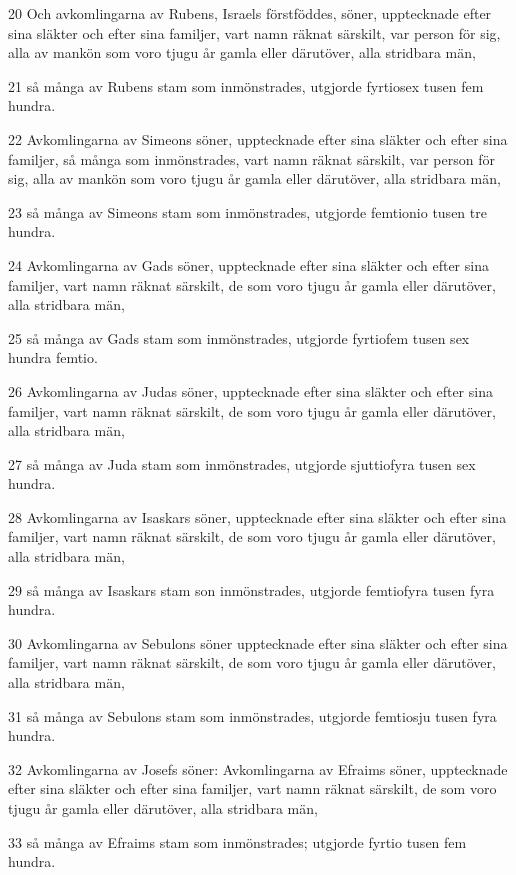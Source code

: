 \par 20 Och avkomlingarna av Rubens, Israels förstföddes, söner, upptecknade efter sina släkter och efter sina familjer, vart namn räknat särskilt, var person för sig, alla av mankön som voro tjugu år gamla eller därutöver, alla stridbara män,
\par 21 så många av Rubens stam som inmönstrades, utgjorde fyrtiosex tusen fem hundra.
\par 22 Avkomlingarna av Simeons söner, upptecknade efter sina släkter och efter sina familjer, så många som inmönstrades, vart namn räknat särskilt, var person för sig, alla av mankön som voro tjugu år gamla eller därutöver, alla stridbara män,
\par 23 så många av Simeons stam som inmönstrades, utgjorde femtionio tusen tre hundra.
\par 24 Avkomlingarna av Gads söner, upptecknade efter sina släkter och efter sina familjer, vart namn räknat särskilt, de som voro tjugu år gamla eller därutöver, alla stridbara män,
\par 25 så många av Gads stam som inmönstrades, utgjorde fyrtiofem tusen sex hundra femtio.
\par 26 Avkomlingarna av Judas söner, upptecknade efter sina släkter och efter sina familjer, vart namn räknat särskilt, de som voro tjugu år gamla eller därutöver, alla stridbara män,
\par 27 så många av Juda stam som inmönstrades, utgjorde sjuttiofyra tusen sex hundra.
\par 28 Avkomlingarna av Isaskars söner, upptecknade efter sina släkter och efter sina familjer, vart namn räknat särskilt, de som voro tjugu år gamla eller därutöver, alla stridbara män,
\par 29 så många av Isaskars stam son inmönstrades, utgjorde femtiofyra tusen fyra hundra.
\par 30 Avkomlingarna av Sebulons söner upptecknade efter sina släkter och efter sina familjer, vart namn räknat särskilt, de som voro tjugu år gamla eller därutöver, alla stridbara män,
\par 31 så många av Sebulons stam som inmönstrades, utgjorde femtiosju tusen fyra hundra.
\par 32 Avkomlingarna av Josefs söner: Avkomlingarna av Efraims söner, upptecknade efter sina släkter och efter sina familjer, vart namn räknat särskilt, de som voro tjugu år gamla eller därutöver, alla stridbara män,
\par 33 så många av Efraims stam som inmönstrades; utgjorde fyrtio tusen fem hundra.

